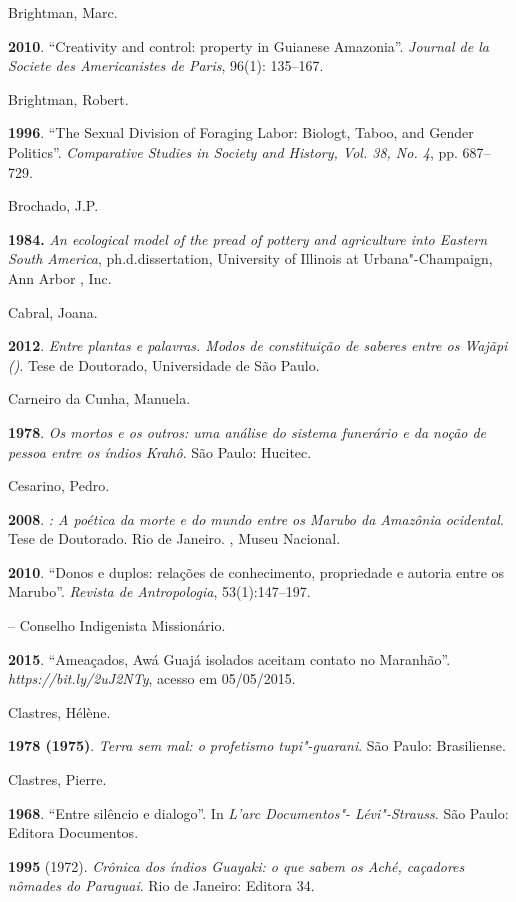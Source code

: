 Brightman, Marc.

\textbf{2010}. ``Creativity and control: property in Guianese
Amazonia''. \emph{Journal de la Societe des Americanistes de Paris},
96(1): 135--167.

Brightman, Robert.

\textbf{1996}. ``The Sexual Division of Foraging Labor: Biologt, Taboo,
and Gender Politics''. \emph{Comparative Studies in Society and History,
Vol. 38, No. 4}, pp. 687--729.

Brochado, J.P.

\textbf{1984.} \emph{An ecological model of the pread of pottery and
agriculture into Eastern South America}, ph.d.dissertation, University
of Illinois at Urbana"-Champaign, Ann Arbor , Inc.

Cabral, Joana.

\textbf{2012}. \emph{Entre plantas e palavras. Modos de constituição de
saberes entre os Wajãpi ()}. Tese de Doutorado, Universidade de São
Paulo.

Carneiro da Cunha, Manuela.

\textbf{1978}. \emph{Os mortos e os outros: uma análise do sistema
funerário e da noção de pessoa entre os índios Krahô}. São Paulo:
Hucitec.

Cesarino, Pedro.

\textbf{2008}. \emph{: A poética da morte e do mundo entre os
Marubo da Amazônia ocidental}. Tese de Doutorado. Rio de Janeiro. ,
Museu Nacional.

\textbf{2010}. ``Donos e duplos: relações de conhecimento, propriedade
e autoria entre os Marubo''. \emph{Revista de Antropologia},
53(1):147--197.

 -- Conselho Indigenista Missionário.

\textbf{2015}. ``Ameaçados, Awá Guajá isolados aceitam contato no
Maranhão''. \emph{https://bit.ly/2uJ2NTy}, acesso em 05/05/2015.

Clastres, Hélène.

\textbf{1978 (1975)}. \emph{Terra sem mal: o profetismo tupi"-guarani}.
São Paulo: Brasiliense.

Clastres, Pierre.

\textbf{1968}. ``Entre silêncio e dialogo''. In \emph{L'arc Documentos"-
Lévi"-Strauss}. São Paulo: Editora Documentos.

\textbf{1995} (1972). \emph{Crônica dos índios Guayaki: o que sabem os
Aché, caçadores nômades do Paraguai}. Rio de Janeiro: Editora 34.

